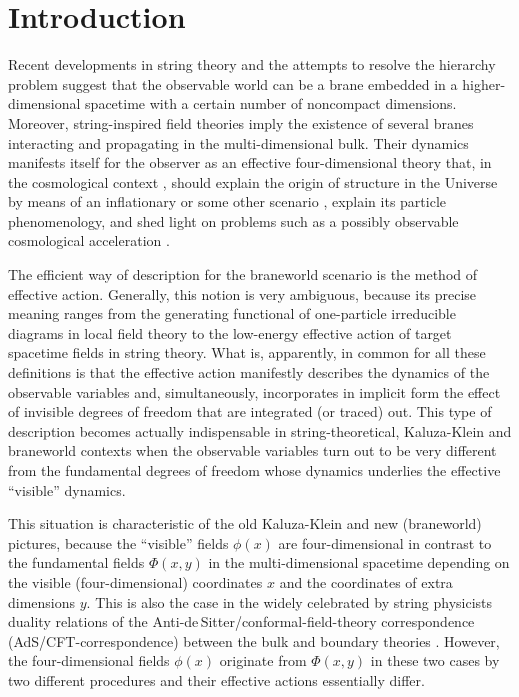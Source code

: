 \documentclass[a4paper,preprint,nofootinbib,
                 showpacs,preprintnumbers,amsmath,amssymb]{revtex4}
\begin{document}
\section{Introduction\label{intro}} 
Recent developments in string theory 
\cite{string} and the attempts to resolve the hierarchy problem 
\cite{hierarchy} suggest that the observable world can be a brane 
embedded in a higher-dimensional spacetime with a certain number 
of noncompact dimensions. Moreover, string-inspired field theories 
imply the existence of several branes interacting and propagating 
in the multi-dimensional bulk. Their dynamics manifests itself for 
the observer as an effective four-dimensional theory that, in the 
cosmological context \cite{BDL,ShiMaSa}, should explain the origin 
of structure in the Universe by means of an inflationary or some 
other scenario \cite{Ekpyr,Pyr}, explain its particle 
phenomenology, and shed light on problems such as a possibly 
observable cosmological acceleration \cite{accel}. 
 
The efficient way of description for the braneworld scenario is 
the method of effective action. Generally, this notion is very 
ambiguous, because its precise meaning ranges from the generating 
functional of one-particle irreducible diagrams in local field 
theory to the low-energy effective action of target spacetime 
fields in string theory. What is, apparently, in common for all 
these definitions is that the effective action manifestly describes 
the dynamics of the observable variables and, simultaneously, 
incorporates in implicit form the effect of invisible degrees of 
freedom that are integrated (or traced) out. This type of 
description becomes actually indispensable in string-theoretical, 
Kaluza-Klein and braneworld contexts when the observable variables 
turn out to be very different from the fundamental degrees of 
freedom whose dynamics underlies the effective ``visible'' 
dynamics. 
 
This situation is characteristic of the old Kaluza-Klein and new (braneworld) 
pictures, because the ``visible'' fields $\phi(x)$ are four-dimensional in 
contrast to the fundamental fields $\Phi(x,y)$ in the multi-dimensional 
spacetime depending on the visible (four-dimensional) coordinates $x$ and the 
coordinates of extra dimensions $y$. This is also the case in the widely 
celebrated by string physicists duality relations of the  
Anti-de\,Sitter/conformal-field-theory correspondence 
(AdS/CFT-correspondence) between the bulk and boundary theories  
\cite{AdS/CFT}. However, the four-dimensional fields $\phi(x)$  
originate from $\Phi(x,y)$ in these two cases by two different  
procedures and their effective actions essentially differ. 
 
\end{document}
